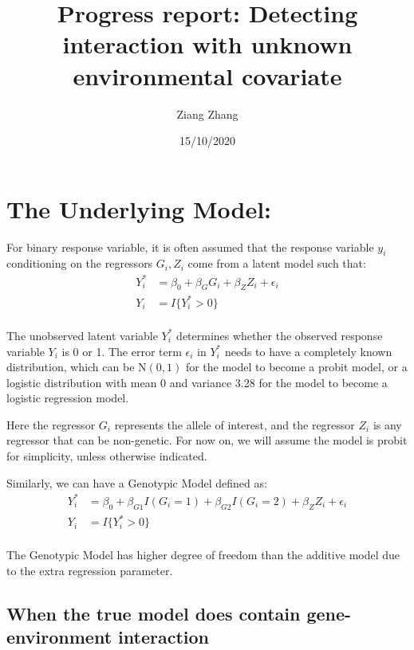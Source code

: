 \documentclass[
]{article}
\title{Progress report: Detecting interaction with unknown environmental
covariate}
\author{Ziang Zhang}
\date{15/10/2020}
\begin{document}
\maketitle

\hypertarget{the-underlying-model}{%
\section{The Underlying Model:}\label{the-underlying-model}}

For binary response variable, it is often assumed that the response
variable \(y_i\) conditioning on the regressors \(G_i,Z_i\) come from a
latent model such that: \begin{equation}\label{eqn:latentformulation}
\begin{aligned}
Y_i^* &= \beta_0 + \beta_G G_i + \beta_Z Z_i + \epsilon_i \\
Y_i &= I\{Y_i^*>0\} \\
\end{aligned}
\end{equation}

The unobserved latent variable \(Y_i^*\) determines whether the observed
response variable \(Y_i\) is 0 or 1. The error term \(\epsilon_i\) in
\(Y_i^*\) needs to have a completely known distribution, which can be
\(\text{N}(0,1)\) for the model to become a probit model, or a logistic
distribution with mean 0 and variance 3.28 for the model to become a
logistic regression model.

Here the regressor \(G_i\) represents the allele of interest, and the
regressor \(Z_i\) is any regressor that can be non-genetic. For now on,
we will assume the model is probit for simplicity, unless otherwise
indicated.

Similarly, we can have a Genotypic Model defined as:\\
\begin{equation}\label{eqn:latentformulationGeno}
\begin{aligned}
Y_i^* &= \beta_0 + \beta_{G1} I(G_i = 1) + \beta_{G2} I(G_i = 2) + \beta_Z Z_i + \epsilon_i \\
Y_i &= I\{Y_i^*>0\} \\
\end{aligned}
\end{equation}

The Genotypic Model has higher degree of freedom than the additive model
due to the extra regression parameter.

\hypertarget{when-the-true-model-does-contain-gene-environment-interaction}{%
\subsection{When the true model does contain gene-environment
interaction}\label{when-the-true-model-does-contain-gene-environment-interaction}}
\end{document}
